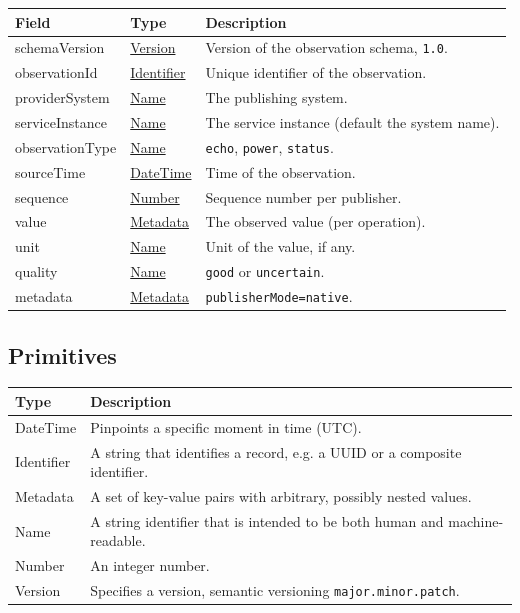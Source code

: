 \documentclass[a4paper]{arrowhead}
\newcommand{\pdef}[1]{{\textcolor{ArrowheadGrey}{#1\label{sec:model:primitives:#1}\label{sec:model:primitives:#1s}\label{sec:model:primitives:#1es}}}}
\newcommand{\pref}[1]{{\textcolor{ArrowheadGrey}{\hyperref[sec:model:primitives:#1]{#1}}}}
\begin{document}
\noindent\begin{tabularx}{\textwidth}{| p{4.25cm} | p{3.5cm} | X |} \hline
\rowcolor{gray!33} Field & Type & Description \\ \hline
schemaVersion & \pref{Version} & Version of the observation schema, \texttt{1.0}. \\ \hline
observationId & \pref{Identifier} & Unique identifier of the observation. \\ \hline
providerSystem & \pref{Name} & The publishing system. \\ \hline
serviceInstance & \pref{Name} & The service instance (default the system name). \\ \hline
observationType & \pref{Name} & \texttt{echo}, \texttt{power}, \texttt{status}. \\ \hline
sourceTime & \pref{DateTime} & Time of the observation. \\ \hline
sequence & \pref{Number} & Sequence number per publisher. \\ \hline
value & \pref{Metadata} & The observed value (per operation). \\ \hline
unit & \pref{Name} & Unit of the value, if any. \\ \hline
quality & \pref{Name} & \texttt{good} or \texttt{uncertain}. \\ \hline
metadata & \pref{Metadata} & \texttt{publisherMode=native}. \\ \hline
\end{tabularx}

\subsection{Primitives}
\label{sec:model:primitives}

\noindent\begin{tabularx}{\textwidth}{| p{3cm} | X |} \hline
\rowcolor{gray!33} Type & Description \\ \hline
\pdef{DateTime} & Pinpoints a specific moment in time (UTC). \\ \hline
\pdef{Identifier} & A string that identifies a record, e.g. a UUID or a composite identifier. \\ \hline
\pdef{Metadata} & A set of key-value pairs with arbitrary, possibly nested values. \\ \hline
\pdef{Name} & A string identifier that is intended to be both human and machine-readable. \\ \hline
\pdef{Number} & An integer number. \\ \hline
\pdef{Version} & Specifies a version, semantic versioning \texttt{major.minor.patch}. \\ \hline
\end{tabularx}
\end{document}
